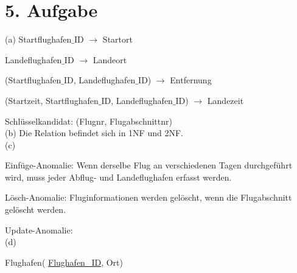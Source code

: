 \documentclass[fleqn]{article}
\begin{document}
\section{5. Aufgabe}

(a)
Startflughafen$ \_ $ID $\rightarrow$ Startort

Landeflughafen$ \_ $ID $\rightarrow$ Landeort

(Startflughafen$ \_ $ID, Landeflughafen$ \_ $ID) $\rightarrow$ Entfernung

(Startzeit, Startflughafen$ \_ $ID, Landeflughafen$ \_ $ID) $\rightarrow$ Landezeit

Schlüsselkandidat: (Flugnr, Flugabschnittnr)
\\
(b)
Die Relation befindet sich in 1NF und 2NF.
\\
(c)

Einfüge-Anomalie: Wenn derselbe Flug an verschiedenen Tagen durchgeführt wird, muss jeder Abflug- und Landeflughafen erfasst werden.

Lösch-Anomalie: Fluginformationen werden gelöscht, wenn die Flugabschnitt gelöscht werden.

Update-Anomalie: 
\\
(d)

Flughafen( \underline{Flughafen\_ID}, Ort)
\end{document}
